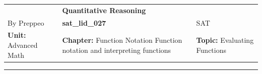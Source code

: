 \documentclass[11pt,paper=a4,answers]{exam}
\begin{document}
\begin{center}
    \centering
    \renewcommand{\arraystretch}{1.5}
    \begin{tabularx}{\textwidth}{YYY}
    & \normalsize\bf{{\Large{{Quantitative Reasoning}}}} & \\
    By Preppeo & \normalsize\bf{{sat\_lid\_027}} & SAT\\
    \normalsize{{\textbf{{Unit:}} Advanced Math}} & \normalsize{{\textbf{{Chapter:}} Function Notation	Function notation and interpreting functions}} & \normalsize{{\textbf{{Topic:}} Evaluating Functions}} \\
    \end{tabularx}
\end{center}
\par\noindent\rule{\textwidth}{1pt}
\end{document}
